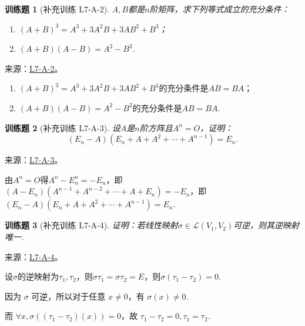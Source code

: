 \documentclass[UTF8,12pt,a4paper,fontset=fandol]{ctexart}
\newtheorem{exercise}{训练题}[section]
\begin{document}
\begin{exercise}[补充训练 L7-A-2]\label{prob:L7-A-2}
$A,B$都是$n$阶矩阵，求下列等式成立的充分条件：
        \begin{enumerate}
            \item $(A+B)^3=A^3+3A^2B+3AB^2+B^3$；

            \item $(A+B)(A-B)=A^2-B^2$.
        \end{enumerate}
\end{exercise}
\noindent 来源：\href{https://github.com/yhwu-is/Linear-Algebra-Left-Undone/blob/new/%E8%AE%B2%E4%B9%89/%E4%B8%93%E9%A2%98/7%20%E7%BA%BF%E6%80%A7%E6%98%A0%E5%B0%84%E7%9F%A9%E9%98%B5%E8%A1%A8%E7%A4%BA%E4%B8%8E%E7%9F%A9%E9%98%B5%E8%BF%90%E7%AE%97%E5%9F%BA%E7%A1%80.tex}{L7-A-2}。
\begin{solve}
\begin{enumerate}
                \item $(A+B)^3=A^3+3A^2B+3AB^2+B^3$的充分条件是$AB=BA$；

                \item $(A+B)(A-B)=A^2-B^2$的充分条件是$AB=BA$.
            \end{enumerate}
\end{solve}

\begin{exercise}[补充训练 L7-A-3]\label{prob:L7-A-3}
设$A$是$n$阶方阵且$A^n=O$，证明：
        \[(E_n-A)(E_n+A+A^2+\cdots+A^{n-1})=E_n.\]
\end{exercise}
\noindent 来源：\href{https://github.com/yhwu-is/Linear-Algebra-Left-Undone/blob/new/%E8%AE%B2%E4%B9%89/%E4%B8%93%E9%A2%98/7%20%E7%BA%BF%E6%80%A7%E6%98%A0%E5%B0%84%E7%9F%A9%E9%98%B5%E8%A1%A8%E7%A4%BA%E4%B8%8E%E7%9F%A9%E9%98%B5%E8%BF%90%E7%AE%97%E5%9F%BA%E7%A1%80.tex}{L7-A-3}。
\begin{solve}
由$A^n=O$得$A^n-E_n^n=-E_n$，即$(A-E_n)(A^{n-1}+A^{n-2}+\cdots+A+E_n)=-E_n$，即$(E_n-A)(E_n+A+A^2+\cdots+A^{n-1})=E_n$.
\end{solve}

\begin{exercise}[补充训练 L7-A-4]\label{prob:L7-A-4}
证明：若线性映射$\sigma \in \mathcal{L}(V_1,V_2)$可逆，则其逆映射唯一.
\end{exercise}
\noindent 来源：\href{https://github.com/yhwu-is/Linear-Algebra-Left-Undone/blob/new/%E8%AE%B2%E4%B9%89/%E4%B8%93%E9%A2%98/7%20%E7%BA%BF%E6%80%A7%E6%98%A0%E5%B0%84%E7%9F%A9%E9%98%B5%E8%A1%A8%E7%A4%BA%E4%B8%8E%E7%9F%A9%E9%98%B5%E8%BF%90%E7%AE%97%E5%9F%BA%E7%A1%80.tex}{L7-A-4}。
\begin{solve}
设$\sigma$的逆映射为$\tau_1,\tau_2$，则$\sigma\tau_1=\sigma\tau_2=E$，则$\sigma(\tau_1-\tau_2)=0$.

            因为 $\sigma$ 可逆，所以对于任意 $x \neq 0$，有 $\sigma(x) \neq 0$.

            而 $\forall x, \sigma((\tau_1-\tau_2)(x))=0$，故 $\tau_1-\tau_2=0, \tau_1=\tau_2$.
\end{solve}
\end{document}
